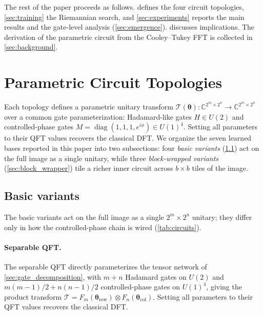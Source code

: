 \documentclass[a4paper, twocolumn]{quantumarticle}
\newcommand{\CC}{\mathbb{C}}
\newcommand{\TT}{\mathcal{T}}
\newcommand{\diag}{\operatorname{diag}}
\begin{document}
The rest of the paper proceeds as follows.
 defines the four circuit topologies, \cref{sec:training} the Riemannian search, and \cref{sec:experiments} reports the main results and the gate-level analysis (\cref{sec:emergence}).
 discusses implications.
The derivation of the parametric circuit from the Cooley--Tukey FFT is collected in \cref{sec:background}.

\section{Parametric Circuit Topologies}
\label{sec:circuits}

Each topology defines a parametric unitary transform $\TT(\boldsymbol{\theta}): \CC^{2^m \times 2^n} \to \CC^{2^m \times 2^n}$ over a common gate parameterization: Hadamard-like gates $H \in U(2)$ and controlled-phase gates $M = \diag(1, 1, 1, e^{i\phi}) \in U(1)^4$.
Setting all parameters to their QFT values recovers the classical DFT.
We organize the seven learned bases reported in this paper into two subsections: four \emph{basic variants} (\cref{sec:basic_variants}) act on the full image as a single unitary, while three \emph{block-wrapped variants} (\cref{sec:block_wrapper}) tile a richer inner circuit across $b \times b$ tiles of the image.

\subsection{Basic variants}
\label{sec:basic_variants}

The basic variants act on the full image as a single $2^m \times 2^n$ unitary; they differ only in how the controlled-phase chain is wired (\cref{tab:circuits}).

\paragraph{Separable QFT.}
\label{sec:separable_qft}
The separable QFT directly parameterizes the tensor network of \cref{sec:gate_decomposition}, with $m + n$ Hadamard gates on $U(2)$ and $m(m-1)/2 + n(n-1)/2$ controlled-phase gates on $U(1)^4$, giving the product transform $\TT = F_m(\boldsymbol{\theta}_{\text{row}}) \otimes F_n(\boldsymbol{\theta}_{\text{col}})$.
Setting all parameters to their QFT values recovers the classical DFT.
\end{document}
